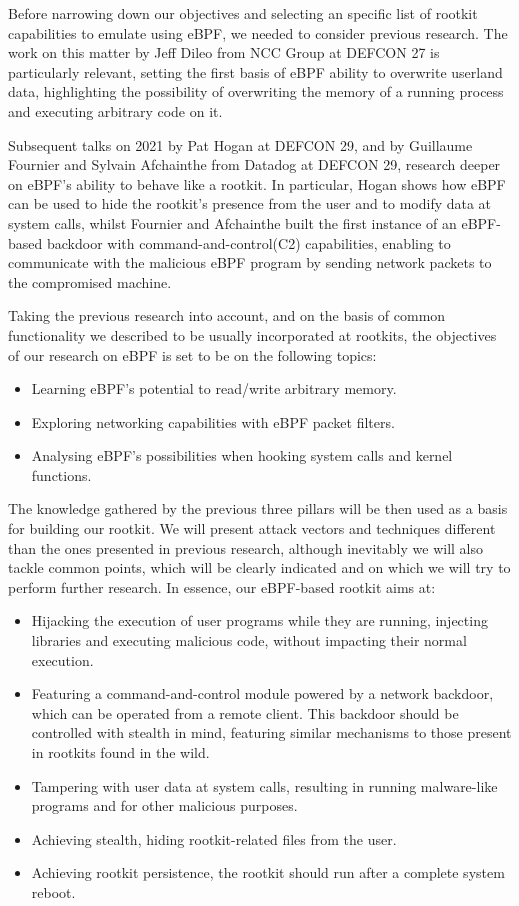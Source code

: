 \documentclass[12pt]{report} %
\begin{document}
Before narrowing down our objectives and selecting an specific list of rootkit capabilities to emulate using eBPF, we needed to consider previous research. The work on this matter by Jeff Dileo from NCC Group at DEFCON 27\cite{evil_ebpf} is particularly relevant, setting the first basis of eBPF ability to overwrite userland data, highlighting the possibility of overwriting the memory of a running process and executing arbitrary code on it.

Subsequent talks on 2021 by Pat Hogan at DEFCON 29\cite{bad_ebpf}, and by Guillaume Fournier and Sylvain Afchainthe from Datadog at DEFCON 29\cite{ebpf_friends}, research deeper on eBPF's ability to behave like a rootkit. In particular, Hogan shows how eBPF can be used to hide the rootkit's presence from the user and to modify data at system calls, whilst Fournier and Afchainthe built the first instance of an eBPF-based backdoor with command-and-control(C2) capabilities, enabling to communicate with the malicious eBPF program by sending network packets to the compromised machine.

Taking the previous research into account, and on the basis of common functionality we described to be usually incorporated at rootkits, the objectives of our research on eBPF is set to be on the following topics:
\begin{itemize}
\item Learning eBPF's potential to read/write arbitrary memory.
\item Exploring networking capabilities with eBPF packet filters.
\item Analysing eBPF's possibilities when hooking system calls and kernel functions.
\end{itemize}

The knowledge gathered by the previous three pillars will be then used as a basis for building our rootkit. We will present attack vectors and techniques different than the ones presented in previous research, although inevitably we will also tackle common points, which will be clearly indicated and on which we will try to perform further research. In essence, our eBPF-based rootkit aims at:
\begin{itemize}
\item Hijacking the execution of user programs while they are running, injecting libraries and executing malicious code, without impacting their normal execution.
\item Featuring a command-and-control module powered by a network backdoor, which can be operated from a remote client. This backdoor should be controlled with stealth in mind, featuring similar mechanisms to those present in rootkits found in the wild.
\item Tampering with user data at system calls, resulting in running malware-like programs and for other malicious purposes.
\item Achieving stealth, hiding rootkit-related files from the user.
\item Achieving rootkit persistence, the rootkit should run after a complete system reboot.
\
\end{itemize}
\end{document}
